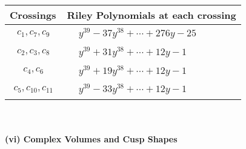 \documentclass[1p]{elsarticle_modified}
\theoremstyle{definition}
\begin{document}
\begin{tabular}{m{50pt}|m{274pt}}
Crossings & \hspace{64pt}Riley Polynomials at each crossing \\
\hline $$\begin{aligned}c_{1},c_{7},c_{9}\end{aligned}$$&$\begin{aligned}
&y^{39}-37 y^{38}+\cdots+276 y-25
\end{aligned}$\\
\hline $$\begin{aligned}c_{2},c_{3},c_{8}\end{aligned}$$&$\begin{aligned}
&y^{39}+31 y^{38}+\cdots+12 y-1
\end{aligned}$\\
\hline $$\begin{aligned}c_{4},c_{6}\end{aligned}$$&$\begin{aligned}
&y^{39}+19 y^{38}+\cdots+12 y-1
\end{aligned}$\\
\hline $$\begin{aligned}c_{5},c_{10},c_{11}\end{aligned}$$&$\begin{aligned}
&y^{39}-33 y^{38}+\cdots+12 y-1
\end{aligned}$\\
\hline
\end{tabular}\\~\\
\newpage\flushleft \textbf{(vi) Complex Volumes and Cusp Shapes}
\end{document}
